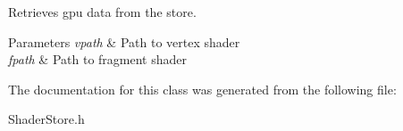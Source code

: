 Retrieves gpu data from the store. 


\begin{DoxyParams}{Parameters}
{\em vpath} & Path to vertex shader \\
\hline
{\em fpath} & Path to fragment shader \\
\hline
\end{DoxyParams}


The documentation for this class was generated from the following file\+:\begin{DoxyCompactItemize}
\item 
Shader\+Store.\+h\end{DoxyCompactItemize}
